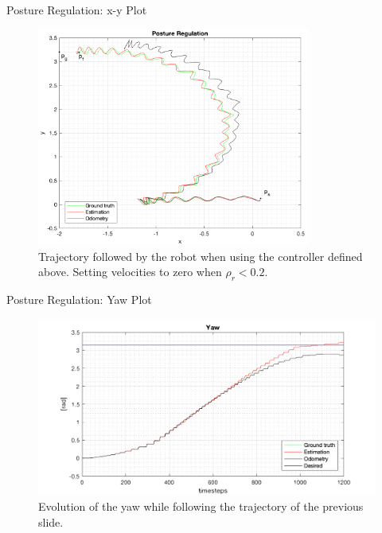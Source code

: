 \documentclass[10pt]{beamer}
\begin{document}
    \begin{frame}{Posture Regulation: x-y Plot}
        \begin{figure}
            \caption{Trajectory followed by the robot when using the controller
                defined above. Setting velocities to zero when
                $\rho_r < 0.2$.}
            \vspace{-0.3cm}
            \includegraphics[width=0.8\textwidth]{images/posture_regulation.png}
        \end{figure}
    \end{frame}

    \begin{frame}{Posture Regulation: Yaw Plot}
        \begin{figure}
            \caption{Evolution of the yaw while following the trajectory
                of the previous slide.}
            \vspace{-0.3cm}
            \includegraphics[width=\textwidth]{images/yaw_postureregulation.png}
        \end{figure}
    \end{frame}
\end{document}
